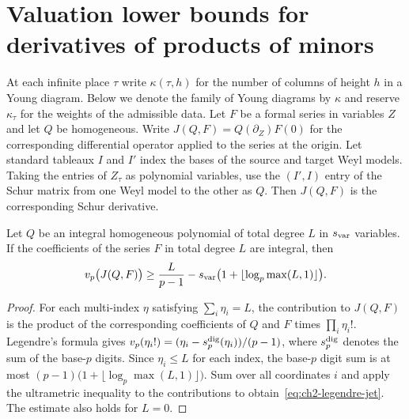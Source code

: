\section{Valuation lower bounds for derivatives of products of minors}
\label{sec:ch2-jet-divisibility}

At each infinite place $\tau$ write $\kappa(\tau,h)$ for the number of columns of height $h$ in a Young diagram. Below we denote the family of Young diagrams by $\kappa$ and reserve $\kappa_\tau$ for the weights of the admissible data. Let $F$ be a formal series in variables $Z$ and let $Q$ be homogeneous. Write $J(Q,F)=Q(\partial_Z)F(0)$ for the corresponding differential operator applied to the series at the origin. Let standard tableaux $I$ and $I'$ index the bases of the source and target Weyl models. Taking the entries of $Z_\tau$ as polynomial variables, use the $(I',I)$ entry of the Schur matrix from one Weyl model to the other as $Q$. Then $J(Q,F)$ is the corresponding Schur derivative.

\begin{lemma}
\label{lem:ch2-legendre-jet}
Let $Q$ be an integral homogeneous polynomial of total degree $L$ in $s_{\rm var}$ variables. If the coefficients of the series $F$ in total degree $L$ are integral, then
\begin{equation}
\label{eq:ch2-legendre-jet}
 v_p\bigl(J(Q,F)\bigr)\ge
 \frac{L}{p-1}-s_{\rm var}\bigl(1+\lfloor\log_p\max(L,1)\rfloor\bigr).
\end{equation}
\end{lemma}

\begin{proof}
For each multi-index $\eta$ satisfying $\sum_i\eta_i=L$, the contribution to $J(Q,F)$ is the product of the corresponding coefficients of $Q$ and $F$ times $\prod_i\eta_i!$. Legendre's formula gives $v_p(\eta_i!)=(\eta_i-s_p^{\rm dig}(\eta_i))/(p-1)$, where $s_p^{\rm dig}$ denotes the sum of the base-$p$ digits. Since $\eta_i\le L$ for each index, the base-$p$ digit sum is at most $(p-1)\bigl(1+\lfloor\log_p\max(L,1)\rfloor\bigr)$. Sum over all coordinates $i$ and apply the ultrametric inequality to the contributions to obtain~\eqref{eq:ch2-legendre-jet}. The estimate also holds for $L=0$.
\end{proof}

